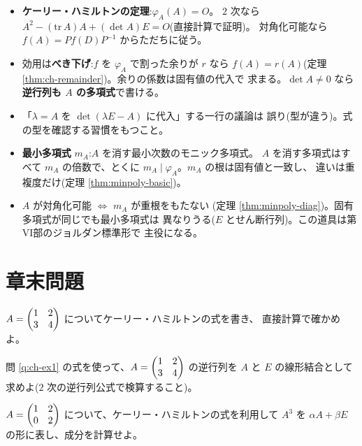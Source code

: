 \begin{matome}
\begin{itemize}
\item \textbf{ケーリー・ハミルトンの定理}:$\varphi_A(A) = O$。
$2$ 次なら $A^2 - (\mathrm{tr}\,A)A + (\det A)E = O$(直接計算で証明)。
対角化可能なら $f(A) = P f(D) P^{-1}$ からただちに従う。
\item 効用は\textbf{べき下げ}:$f$ を $\varphi_A$ で割った余りが $r$ なら
$f(A) = r(A)$(定理 \ref{thm:ch-remainder})。余りの係数は固有値の代入で
求まる。$\det A \neq 0$ なら\textbf{逆行列も $A$ の多項式}で書ける。
\item 「$\lambda = A$ を $\det(\lambda E - A)$ に代入」する一行の議論は
誤り(型が違う)。式の型を確認する習慣をもつこと。
\item \textbf{最小多項式} $m_A$:$A$ を消す最小次数のモニック多項式。
$A$ を消す多項式はすべて $m_A$ の倍数で、とくに
$m_A \mid \varphi_A$。$m_A$ の根は固有値と一致し、
違いは重複度だけ(定理 \ref{thm:minpoly-basic})。
\item $A$ が対角化可能 $\iff$ $m_A$ が重根をもたない
(定理 \ref{thm:minpoly-diag})。固有多項式が同じでも最小多項式は
異なりうる($E$ とせん断行列)。この道具は第VI部のジョルダン標準形で
主役になる。
\end{itemize}
\end{matome}

\section*{章末問題}

\begin{mondai}[基本]\label{q:ch-ex1}
$A = \begin{pmatrix}1 & 2 \\ 3 & 4\end{pmatrix}$ についてケーリー・ハミルトンの式を書き、
直接計算で確かめよ。
\end{mondai}

\begin{mondai}[基本]\label{q:ch-ex2}
問 \ref{q:ch-ex1} の式を使って、$A = \begin{pmatrix}1 & 2 \\ 3 & 4\end{pmatrix}$ の逆行列を
$A$ と $E$ の線形結合として求めよ($2$ 次の逆行列公式で検算すること)。
\end{mondai}

\begin{mondai}[基本]\label{q:ch-ex3}
$A = \begin{pmatrix}1 & 2 \\ 0 & 2\end{pmatrix}$ について、ケーリー・ハミルトンの式を利用して
$A^3$ を $\alpha A + \beta E$ の形に表し、成分を計算せよ。
\end{mondai}

